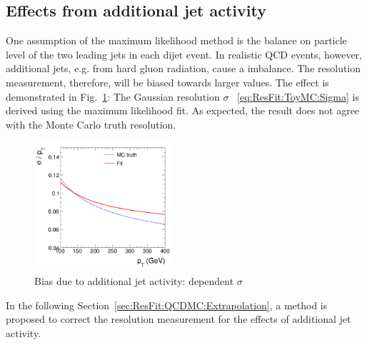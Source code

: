

\subsection{Effects from additional jet activity}\label{sec:ResFit:QCDMC:AddJetAct}

One assumption of the maximum likelihood method is the \pt balance on
particle level of the two leading jets in each dijet event.
In realistic QCD events, however, additional jets, e.g. from hard
gluon radiation, cause a \ptparticle imbalance.
The resolution measurement, therefore, will be biased
towards larger values.
The effect is demonstrated in Fig.~\ref{fig:ResFit:QCDMC:AddJetAct:Fit}: 
The Gaussian resolution $\sigma$ ~\eqref{eq:ResFit:ToyMC:Sigma} is derived using the maximum
likelihood fit.
As expected, the result does not agree with the Monte Carlo truth
resolution.
\begin{figure}[ht]
  \centering
  \includegraphics[width=0.45\textwidth]{figures/resFit_PtDependentSigma}
  \caption{Bias due to additional jet activity: \pt dependent $\sigma$}
  \label{fig:ResFit:QCDMC:AddJetAct:Fit}
\end{figure}

In the following Section~\ref{sec:ResFit:QCDMC:Extrapolation}, a method is proposed to correct the resolution
measurement for the effects of additional jet activity.

